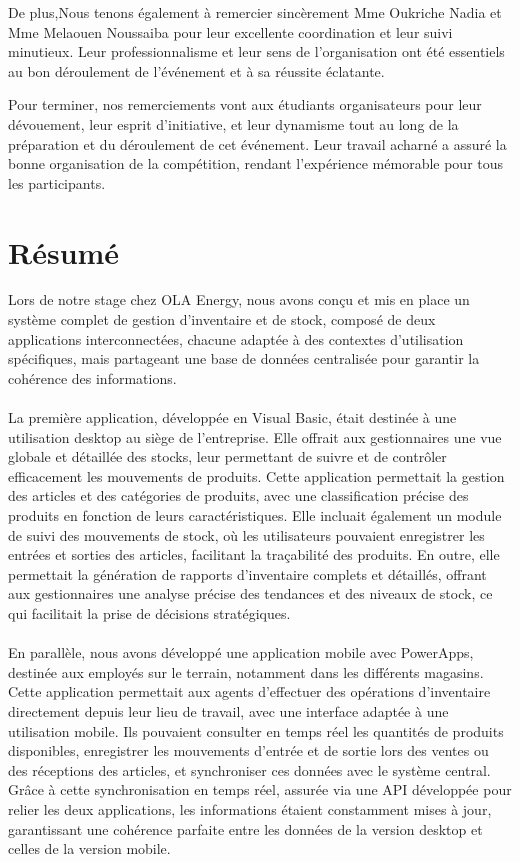 \documentclass[a4paper, oneside, 12pt, final]{extreport}
\begin{document}
De plus,Nous tenons également à remercier sincèrement Mme Oukriche Nadia et Mme Melaouen Noussaiba pour leur excellente coordination et leur suivi minutieux. Leur professionnalisme et leur sens de l'organisation ont été essentiels au bon déroulement de l'événement et à sa réussite éclatante.

Pour terminer, nos remerciements vont aux étudiants organisateurs pour leur dévouement, leur esprit d'initiative, et leur dynamisme tout au long de la préparation et du déroulement de cet événement. Leur travail acharné a assuré la bonne organisation de la compétition, rendant l'expérience mémorable pour tous les participants.
\chapter*{Résumé}
Lors de notre stage chez OLA Energy, nous avons conçu et mis en place un système complet de gestion d'inventaire et de stock, composé de deux applications interconnectées, chacune adaptée à des contextes d'utilisation spécifiques, mais partageant une base de données centralisée pour garantir la cohérence des informations.
\\
\\
La première application, développée en Visual Basic, était destinée à une utilisation desktop au siège de l'entreprise. Elle offrait aux gestionnaires une vue globale et détaillée des stocks, leur permettant de suivre et de contrôler efficacement les mouvements de produits. Cette application permettait la gestion des articles et des catégories de produits, avec une classification précise des produits en fonction de leurs caractéristiques. Elle incluait également un module de suivi des mouvements de stock, où les utilisateurs pouvaient enregistrer les entrées et sorties des articles, facilitant la traçabilité des produits. En outre, elle permettait la génération de rapports d'inventaire complets et détaillés, offrant aux gestionnaires une analyse précise des tendances et des niveaux de stock, ce qui facilitait la prise de décisions stratégiques.
\\
\\
En parallèle, nous avons développé une application mobile avec PowerApps, destinée aux employés sur le terrain, notamment dans les différents magasins. Cette application permettait aux agents d'effectuer des opérations d'inventaire directement depuis leur lieu de travail, avec une interface adaptée à une utilisation mobile. Ils pouvaient consulter en temps réel les quantités de produits disponibles, enregistrer les mouvements d'entrée et de sortie lors des ventes ou des réceptions des articles, et synchroniser ces données avec le système central. Grâce à cette synchronisation en temps réel, assurée via une API développée pour relier les deux applications, les informations étaient constamment mises à jour, garantissant une cohérence parfaite entre les données de la version desktop et celles de la version mobile.
\end{document}
